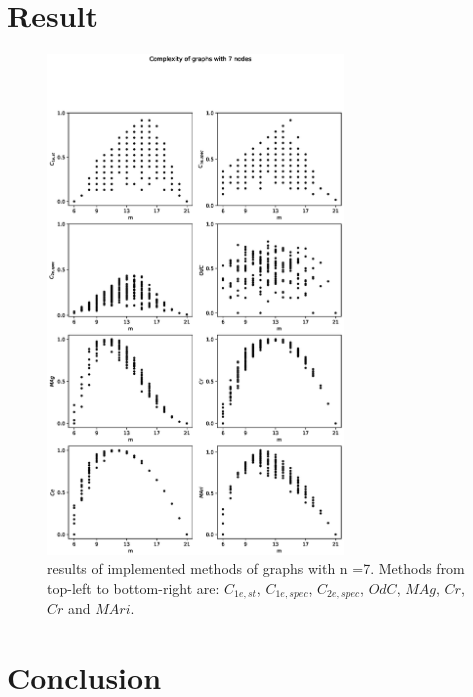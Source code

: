 \documentclass[12pt]{article}
\begin{document}
\section{Result}


\clearpage
\begin{figure}[ht]
    \includegraphics[width=0.7\textwidth]{complexities.eps}
    \centering
    \caption{results of implemented methods of graphs with n =7. Methods from top-left to bottom-right are: $C_{1e,st}$, $C_{1e,spec}$, $C_{2e,spec}$, $OdC$, $MAg$, $Cr$, $Cr$ and $MAri$.}
\end{figure}
\section{Conclusion}

\printbibliography
\end{document}

